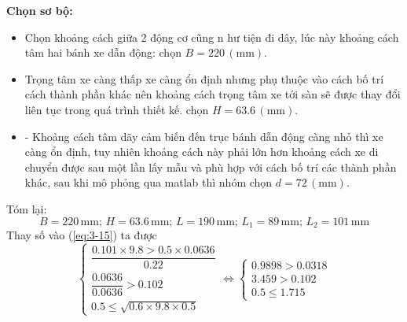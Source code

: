             \hspace*{0.6cm}\textbf{Chọn sơ bộ:}\\
            \begin{itemize}
                \item Chọn khoảng cách giữa 2 động cơ cũng n    hư tiện đi dây, lúc này khoảng cách tâm hai bánh xe dẫn động: chọn $B = 220 \,(\mathrm{mm})$.
                \item Trọng tâm xe càng thấp xe càng ổn định nhưng phụ thuộc vào cách bố trí cách thành phần khác nên khoảng cách trọng tâm xe tới sàn sẽ được thay đổi liên tục trong quá trình thiết kế. chọn $H = 63.6 \,(\mathrm{mm})$.
                \item -	Khoảng cách tâm dãy cảm biến đến trục bánh dẫn động càng nhỏ thì xe càng ổn định, tuy nhiên khoảng cách này phải lớn hơn khoảng cách xe di chuyển được sau một lần lấy mẫu và phù hợp với cách bố trí các thành phần khác, sau khi mô phỏng qua matlab thì nhóm chọn $d = 72 \,(\mathrm{mm})$.
            \end{itemize}
            \hspace*{0.6cm}Tóm lại:
            \begin{equation*}
                B = 220 \,\mathrm{mm}; \, H = 63.6 \,\mathrm{mm}; \, L = 190 \,\mathrm{mm}; \, L_1 = 89 \,\mathrm{mm}; \, L_2 = 101 \,\mathrm{mm}
            \end{equation*}
            \hspace*{0.6cm}Thay số vào (\ref{eq:3-15}) ta được
            \begin{equation*}
                \begin{cases}
                \dfrac{0.101 \times 9.8 > 0.5 \times 0.0636}{0.22} \\
                \dfrac{0.0636}{0.0636} > 0.102 \\
                0.5 \leq \sqrt{0.6 \times 9.8 \times 0.5}
                \end{cases}
                \Leftrightarrow
                \begin{cases}
                0.9898 > 0.0318 \\
                3.459 > 0.102 \\
                0.5 \leq 1.715
                \end{cases}
            \end{equation*}           
